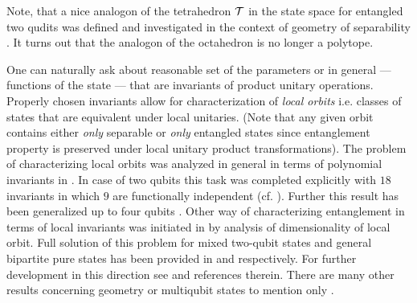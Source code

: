 \documentclass[rmp,12pt,preprint]{revtex4-2}
\begin{document}
Note, that a nice analogon of the tetrahedron ${\cal T}$ in the state space
for entangled two qudits was defined and investigated in the context
of geometry of separability \cite{BaumgartnerHN2007}.
It turns out that the analogon of the octahedron is no longer a polytope.

One can naturally ask about reasonable set of the
parameters or in general --- functions of the state --- that are
invariants of product unitary operations. Properly chosen invariants
allow for characterization of {\it local orbits} i.e. classes of
states that are equivalent under local unitaries.  (Note that any
given orbit contains either {\it only} separable or {\it only}
entangled states since entanglement property is preserved under local
unitary product transformations). The problem of characterizing local
orbits was analyzed in general in terms of polynomial invariants in
\cite{SchlienzMahler,Grassl}. In case of two qubits this task was
completed explicitly with $18$ invariants in which $9$ are
functionally independent \cite{MixedInvariantsI}
(cf. \cite{Grassl}). Further this result has been generalized up to
four qubits \cite{MixedInvariantsII,MixedInvariantsIII}. Other way of
characterizing entanglement in terms of local invariants was initiated
in \cite{LindenOrbitsI,LindenOrbitsII} by analysis of dimensionality
of local orbit. Full solution of this problem for mixed two-qubit
states and general bipartite pure states has been provided in
\cite{2qOrbitsKus} and \cite{SinoleckaZK2001-manifold}
respectively. For further development in this direction see
\cite{KusGeometry} and references therein. There are many other
results concerning geometry or multiqubit states
to mention only \cite{Heydari,Levay2006-4qubits,Miyake2002-hyper}.
\end{document}
